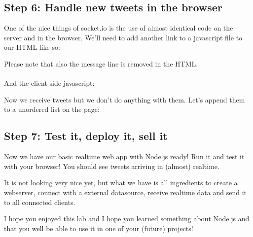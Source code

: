 \documentclass[a4paper]{report}
\begin{document}
\subsection*{Step 6: Handle new tweets in the browser}

One of the nice things of socket.io is the use of almost identical code on the server and in the browser. We'll need to add another link to a javascript file to our HTML like so:



\noindent Please note that also the message line is removed in the HTML.
\\
\\
\noindent And the client side javascript:



\noindent Now we receive tweets but we don't do anything with them. Let's append them to a unordered list on the page:



\subsection*{Step 7: Test it, deploy it, sell it}
Now we have our basic realtime web app with Node.js ready! Run it and test it with your browser! You should see tweets arriving in (almost) realtime. 

It is not looking very nice yet, but what we have is all ingredients to create a webserver, connect with a external datasource, receive realtime data and send it to all connected clients.

I hope you enjoyed this lab and I hope you learned something about Node.js and that you well be able to use it in one of your (future) projects!
\end{document}
